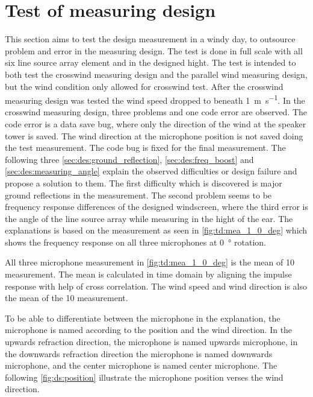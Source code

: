 \section{Test of measuring design}\label{sec:ds:test_of_mes_des}
This section aims to test the design measurement in a windy day, to outsource problem and error in the measuring design. The test is done in full scale with all six line source array element and in the designed hight. The test is intended to both test the crosswind measuring design and the parallel wind measuring design, but the wind condition only allowed for crosswind test. After the crosswind measuring design was tested the wind speed dropped to beneath \SI{1}{\meter\per\second}.
In the crosswind measuring design, three problems and one code error are observed. The code error is a data save bug, where only the direction of the wind at the speaker tower is saved. The wind direction at the microphone position is not saved doing the test measurement. The code bug is fixed for the final measurement. The following three \autoref{sec:des:ground_reflection}, \autoref{sec:des:freq_boost} and \autoref{sec:des:measuring_angle} explain the observed difficulties or design failure and propose a solution to them. 
The first difficulty which is discovered is major ground reflections in the measurement. The second problem seems to be frequency response differences of the designed windscreen, where the third error is the angle of the line source array while measuring in the hight of the ear.  
The explanations is based on the measurement as seen in \autoref{fig:td:mea_1_0_deg} which shows the frequency response on all three microphones at \SI{0}{\degree} rotation.


All three microphone measurement in \autoref{fig:td:mea_1_0_deg} is the mean of 10 measurement. The mean is calculated in time domain by aligning the impulse response with help of cross correlation. The wind speed and wind direction is also the mean of the 10 measurement. 

To be able to differentiate between the microphone in the explanation, the microphone is named according to the position and the wind direction. In the upwards refraction direction, the microphone is named upwards microphone, in the downwards refraction direction the microphone is named downwards microphone, and the center microphone is named center microphone. The following \autoref{fig:ds:position} illustrate the microphone position verses the wind direction.


